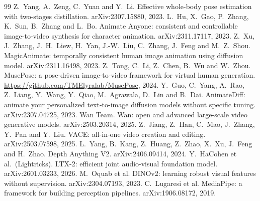 \documentclass[11pt,a4paper,twocolumn]{article}
\begin{document}
\begin{thebibliography}{99}
\small
{}
Z.~Yang, A.~Zeng, C.~Yuan and Y.~Li. Effective whole-body pose estimation with two-stages distillation.
arXiv:2307.15880, 2023.
L.~Hu, X.~Gao, P.~Zhang, K.~Sun, B.~Zhang and L.~Bo. Animate Anyone: consistent and controllable image-to-video
synthesis for character animation. arXiv:2311.17117, 2023.
Z.~Xu, J.~Zhang, J.~H.~Liew, H.~Yan, J.-W.~Liu, C.~Zhang, J.~Feng and M.~Z.~Shou. MagicAnimate: temporally
consistent human image animation using diffusion model. arXiv:2311.16498, 2023.
Z.~Tong, C.~Li, Z.~Chen, B.~Wu and W.~Zhou. MusePose: a pose-driven image-to-video framework for virtual human
generation. \url{https://github.com/TMElyralab/MusePose}, 2024.
Y.~Guo, C.~Yang, A.~Rao, Z.~Liang, Y.~Wang, Y.~Qiao, M.~Agrawala, D.~Lin and B.~Dai. AnimateDiff: animate your
personalized text-to-image diffusion models without specific tuning. arXiv:2307.04725, 2023.
Wan Team. Wan: open and advanced large-scale video generative models. arXiv:2503.20314, 2025.
Z.~Jiang, Z.~Han, C.~Mao, J.~Zhang, Y.~Pan and Y.~Liu. VACE: all-in-one video creation and editing.
arXiv:2503.07598, 2025.
L.~Yang, B.~Kang, Z.~Huang, Z.~Zhao, X.~Xu, J.~Feng and H.~Zhao. Depth Anything V2. arXiv:2406.09414, 2024.
Y.~HaCohen et al.\ (Lightricks). LTX-2: efficient joint audio-visual foundation model. arXiv:2601.03233, 2026.
M.~Oquab et al. DINOv2: learning robust visual features without supervision. arXiv:2304.07193, 2023.
C.~Lugaresi et al. MediaPipe: a framework for building perception pipelines. arXiv:1906.08172, 2019.
\end{thebibliography}
\end{document}

